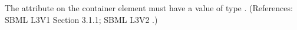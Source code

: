 The attribute  on the  container element
must have a value of type .  (References: SBML L3V1 Section 3.1.1; SBML
L3V2 .)
